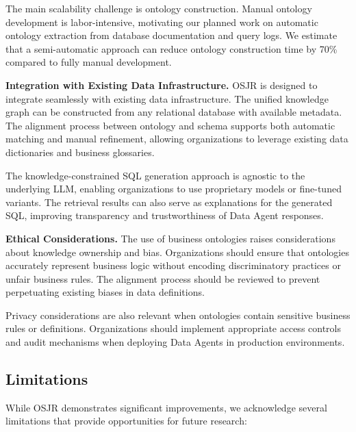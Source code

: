 \documentclass[sigconf, nonatbib]{acmart}
\begin{document}
The main scalability challenge is ontology construction. Manual ontology development is labor-intensive, motivating our planned work on automatic ontology extraction from database documentation and query logs. We estimate that a semi-automatic approach can reduce ontology construction time by 70\% compared to fully manual development.

\textbf{Integration with Existing Data Infrastructure.} OSJR is designed to integrate seamlessly with existing data infrastructure. The unified knowledge graph can be constructed from any relational database with available metadata. The alignment process between ontology and schema supports both automatic matching and manual refinement, allowing organizations to leverage existing data dictionaries and business glossaries.

The knowledge-constrained SQL generation approach is agnostic to the underlying LLM, enabling organizations to use proprietary models or fine-tuned variants. The retrieval results can also serve as explanations for the generated SQL, improving transparency and trustworthiness of Data Agent responses.

\textbf{Ethical Considerations.} The use of business ontologies raises considerations about knowledge ownership and bias. Organizations should ensure that ontologies accurately represent business logic without encoding discriminatory practices or unfair business rules. The alignment process should be reviewed to prevent perpetuating existing biases in data definitions.

Privacy considerations are also relevant when ontologies contain sensitive business rules or definitions. Organizations should implement appropriate access controls and audit mechanisms when deploying Data Agents in production environments.

\subsection{Limitations}

While OSJR demonstrates significant improvements, we acknowledge several limitations that provide opportunities for future research:
\end{document}
